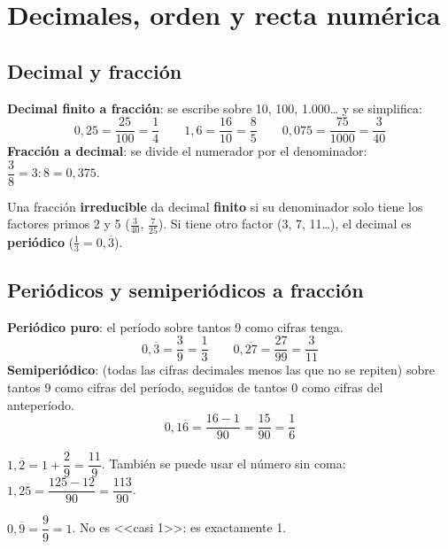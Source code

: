 \section{Decimales, orden y recta numérica}

\subsection{Decimal y fracción}
\textbf{Decimal finito a fracción}: se escribe sobre 10, 100, 1.000\dots{} y se simplifica:
\[ 0{,}25 = \frac{25}{100} = \frac{1}{4} \qquad 1{,}6 = \frac{16}{10} = \frac{8}{5} \qquad 0{,}075 = \frac{75}{1000} = \frac{3}{40} \]
\textbf{Fracción a decimal}: se divide el numerador por el denominador: $\dfrac{3}{8} = 3 : 8 = 0{,}375$.
\begin{clave} Una fracción \textbf{irreducible} da decimal \textbf{finito} si su denominador solo tiene los factores primos 2 y 5 ($\tfrac{3}{40}$, $\tfrac{7}{25}$). Si tiene otro factor (3, 7, 11\dots), el decimal es \textbf{periódico} ($\tfrac{1}{3} = 0{,}\overline{3}$).\end{clave}

\subsection{Periódicos y semiperiódicos a fracción}
\textbf{Periódico puro}: el período sobre tantos 9 como cifras tenga.
\[ 0{,}\overline{3} = \frac{3}{9} = \frac{1}{3} \qquad 0{,}\overline{27} = \frac{27}{99} = \frac{3}{11} \]
\textbf{Semiperiódico}: (todas las cifras decimales menos las que no se repiten) sobre tantos 9 como cifras del período, seguidos de tantos 0 como cifras del anteperíodo.
\[ 0{,}1\overline{6} = \frac{16 - 1}{90} = \frac{15}{90} = \frac{1}{6} \]
\begin{ejemplo} $1{,}\overline{2} = 1 + \dfrac{2}{9} = \dfrac{11}{9}$. También se puede usar el número sin coma: $1{,}2\overline{5} = \dfrac{125 - 12}{90} = \dfrac{113}{90}$.\end{ejemplo}
\begin{ojo} $0{,}\overline{9} = \dfrac{9}{9} = 1$. No es <<casi 1>>: es exactamente 1.\end{ojo}

